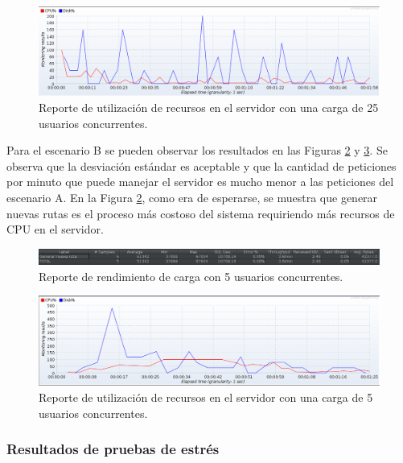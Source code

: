 \begin{figure}[H]
    \centering
    \includegraphics[width=\textwidth]{25_usuarios_cpu_io_editado.png}
    \caption{Reporte de utilización de recursos en el servidor con una carga de 25 usuarios concurrentes.}
    \label{fig:25UsuariosCPUA}
\end{figure}

Para el escenario B se pueden observar los resultados en las Figuras \ref{fig:5UsuariosCargaB} y \ref{fig:5UsuariosCPUB}. Se observa que la desviación estándar es aceptable y que la cantidad de peticiones por minuto que puede manejar el servidor es mucho menor a las peticiones del escenario A. En la Figura \ref{fig:5UsuariosCargaB}, como era de esperarse, se muestra que generar nuevas rutas es el proceso más costoso del sistema requiriendo más recursos de CPU en el servidor.

\begin{figure}[H]
    \centering
    \includegraphics[width=\textwidth]{Chapter7/Chapter7Figs/5_usuarios_doc_editado.png}
    \caption{Reporte de rendimiento de carga con 5 usuarios concurrentes.}
    \label{fig:5UsuariosCargaB}
\end{figure}

\begin{figure}[H]
    \centering
    \includegraphics[width=\textwidth]{5_usuarios_doc_cpu_io_editado.png}
    \caption{Reporte de utilización de recursos en el servidor con una carga de 5 usuarios concurrentes.}
    \label{fig:5UsuariosCPUB}
\end{figure}

\subsubsection{Resultados de pruebas de estrés}
\label{ref:resultadosPruebaEstres}

